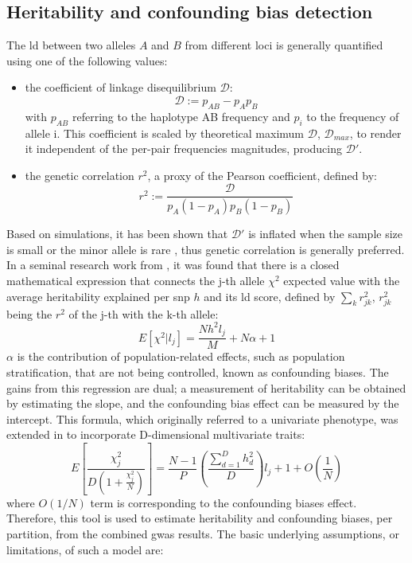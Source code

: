 \subsection{Heritability and confounding bias detection}
\label{subsec:ldsr}
The \ac{ld} between two alleles $A$ and $B$ from different loci is generally quantified using one of the following values: 
\begin{itemize}
	\item{
		the coefficient of linkage disequilibrium $\mathcal{D}$:
		$$
		\mathcal{D} := p_{AB} - p_Ap_B
		$$
		with $p_{AB}$ referring to the haplotype AB frequency and $p_i$ to the frequency of allele i. This coefficient is scaled by theoretical maximum $\mathcal{D}$, $\mathcal{D}_{max}$, to render it independent of the per-pair frequencies magnitudes, producing $\mathcal{D}'$.
	}
	\item{
		the genetic correlation $r^2$, a proxy of the Pearson coefficient, defined by:
		$$
		r^2:= \frac{\mathcal{D}}{p_A(1-p_A)p_B(1-p_B)}
		$$
	}
\end{itemize}
Based on simulations, it has been shown that $\mathcal{D}'$ is inflated when the sample size is small or the minor allele is rare \cite{Teare2002}, thus genetic correlation is generally preferred.  In a seminal research work from \citet{Bulik-Sullivan2015}, it was found that there is a closed mathematical expression that connects the j-th allele $\chi^2$ expected value  with the average heritability explained per \ac{snp} $h$ and its \ac{ld} score, defined by $\sum_k{{r^2_{jk}}}$, $r^2_{jk}$ being the $r^2$ of the j-th with the k-th allele:
$$
E[\chi^2|l_j] = \frac{Nh^2l_j}{M} + N\alpha + 1
$$
$\alpha$ is the contribution of population-related effects, such as population stratification, that are not being controlled, known as confounding biases. The gains from this regression are dual; a measurement of heritability can be obtained by estimating the slope, and the confounding bias effect can be measured by the intercept. This formula, which originally referred to a univariate phenotype, was extended in \cite{Naqvi2021} to incorporate D-dimensional multivariate traits:
$$
E\left[\frac{\chi^2_j}{D\left(1+\frac{\chi^2_j}{N}\right)}\right] = \frac{N-1}{P}\left(\frac{\sum_{d=1}^{D}h_d^2}{D}\right)l_j +1 + O\left(\frac{1}{N}\right)
$$
where $O(1/N)$ term is corresponding to the confounding biases effect. Therefore, this tool is used to estimate heritability and confounding biases, per partition, from the combined \ac{gwas} results.
The basic underlying assumptions, or limitations, of such a model are:
